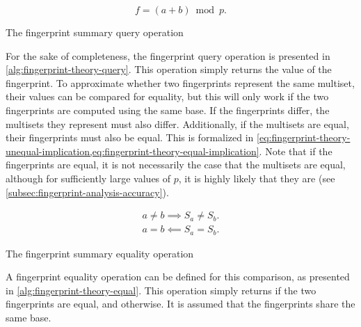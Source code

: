 \begin{equation}
  \label{eq:fingerprint-theory-merge}
  f = \left( a + b \right) \bmod p.
\end{equation}

\begin{algorithm}
  \caption{The fingerprint summary query operation}
  \label{alg:fingerprint-theory-query}
  
\end{algorithm}

For the sake of completeness, the fingerprint query operation is presented in \cref{alg:fingerprint-theory-query}.
This operation simply returns the value of the fingerprint.
To approximate whether two fingerprints represent the same multiset, their values can be compared for equality, but this will only work if the two fingerprints are computed using the same base.
If the fingerprints differ, the multisets they represent must also differ.
Additionally, if the multisets are equal, their fingerprints must also be equal.
This is formalized in \cref{eq:fingerprint-theory-unequal-implication,eq:fingerprint-theory-equal-implication}.
Note that if the fingerprints are equal, it is not necessarily the case that the multisets are equal, although for sufficiently large values of \( p \), it is highly likely that they are (see \cref{subsec:fingerprint-analysis-accuracy}).

\begin{align}
  \label{eq:fingerprint-theory-unequal-implication}
  a \neq b \implies S_{a} \neq S_{b}. \\
  \label{eq:fingerprint-theory-equal-implication}
  a = b \impliedby S_{a} = S_{b}.
\end{align}

\begin{algorithm}
  \caption{The fingerprint summary equality operation}
  \label{alg:fingerprint-theory-equal}
  
\end{algorithm}

A fingerprint equality operation can be defined for this comparison, as presented in \cref{alg:fingerprint-theory-equal}.
This operation simply returns \True{} if the two fingerprints are equal, and \False{} otherwise.
It is assumed that the fingerprints share the same base.
